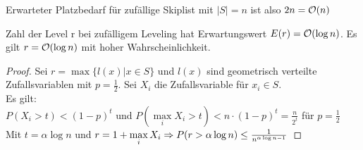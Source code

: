             Erwarteter Platzbedarf für zufällige Skiplist mit $|S|=n$ ist also $2n=\mathcal{O}(n)$
            
            \begin{lemma}
            	Zahl der Level r bei zufälligem Leveling hat Erwartungswert $E(r)=\mathcal{O}(\log n)$. Es gilt $r=\mathcal{O}(\log n)$ mit hoher Wahrscheinlichkeit.
            \end{lemma}
            \begin{proof}
            	Sei $r=\max\{l(x)|x\in S\}$ und $l(x)$ sind geometrisch verteilte Zufallsvariablen mit $p=\frac{1}{2}$.
            	Sei $X_i$ die Zufallsvariable für $x_i\in S$.\\
            	Es gilt:\\
            	$P( X_i>t)<(1-p)^t$ und $P(\max\limits_{i} X_i>t)<n\cdot (1-p)^t=\frac{n}{2^t}$ für $p=\frac{1}{2}$\\
            	Mit $t=\alpha\log n$ und $r=1+\max\limits_i X_i \Ra P(r>\alpha\log n)\le \frac{1}{n^{\alpha\log n -1}}$ 
            \end{proof}


%
%
%

